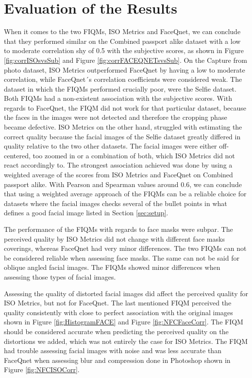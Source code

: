 \section{Evaluation of the Results}
\label{sec:resultsevaluation}
When it comes to the two FIQMs, ISO Metrics and FaceQnet, we can conclude that they performed similar on the Combined passport alike dataset with a low to moderate correlation shy of 0.5 with the subjective scores, as shown in Figure \ref{fig:corrISOsvsSub} and Figure \ref{fig:corrFACEQNETsvsSub}. On the Capture from photo dataset, ISO Metrics outperformed FaceQnet by having a low to moderate correlation, while FaceQnet´s correlation coefficients were considered weak. The dataset in which the FIQMs performed crucially poor, were the Selfie dataset. Both FIQMs had a non-existent association with the subjective scores. With regards to FaceQnet, the FIQM did not work for that particular dataset, because the faces in the images were not detected and therefore the cropping phase became defective. ISO Metrics on the other hand, struggled with estimating the correct quality because the facial images of the Selfie dataset greatly differed in quality relative to the two other datasets. The facial images were either off-centered, too zoomed in or a combination of both, which ISO Metrics did not react accordingly to. The strongest association achieved was done by using a weighted average of the scores from ISO Metrics and FaceQnet on Combined passport alike. With Pearson and Spearman values around 0.6, we can conclude that using a weighted average approach of the FIQMs can be a reliable choice for datasets where the facial images checks several of the bullet points in what defines a good facial image listed in Section \ref{sec:setup}.

The performance of the FIQMs with regards to face masks were subpar. The perceived quality by ISO Metrics did not change with different face masks coverings, whereas FaceQnet had very minor differences. The two FIQMs can not be considered reliable when assessing face masks. The same can not be said for oblique angled facial images. The FIQMs showed minor differences when assessing those types of facial images. 

Assessing the quality of distorted facial images did affect the perceived quality for ISO Metrics, but not for FaceQnet. The last mentioned FIQM perceived the quality consistently with close to perfect association with the original images shown in Figure \ref{fig:HistogramFACE} and Figure \ref{fig:NFCFaceCorr}. The FIQM should be considered accurate when predicting the perceived quality on the distortions we added, which was not entirely the case for ISO Metrics. The FIQM had trouble assessing facial images with noise and was less accurate than FaceQnet when assessing blur and compression done in Photoshop shown in Figure \ref{fig:NFCISOCorr}. 

